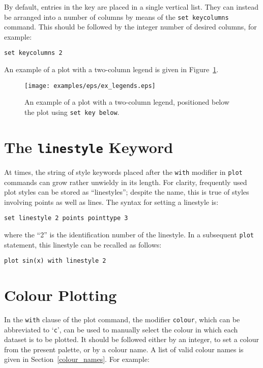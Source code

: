 By default, entries in the key are placed in a single vertical list. They can
instead be arranged into a number of columns by means of the \texttt{set
keycolumns} command. This should be followed by the integer number of desired columns, for
example:

\begin{verbatim}
set keycolumns 2
\end{verbatim}

\noindent An example of a plot with a two-column legend is given in
Figure~\ref{fig:ex_legends}.

\begin{figure}
\begin{center}
\texttt{[image: examples/eps/ex\_legends.eps]}
\end{center}
\caption{An example of a plot with a two-column legend, positioned below the plot using {\tt set key below}.}
\label{fig:ex_legends}
\end{figure}

\section{The \texttt{linestyle} Keyword}

At times, the string of style keywords placed after the \texttt{with} modifier
in \texttt{plot} commands can grow rather unwieldy in its length. For clarity,
frequently used plot styles can be stored as ``linestyles''; despite the name,
this is true of styles involving points as well as lines. The syntax for
setting a linestyle is:

\begin{verbatim}
set linestyle 2 points pointtype 3
\end{verbatim}

\noindent where the ``2'' is the identification number of the linestyle. In a
subsequent \texttt{plot} statement, this linestyle can be recalled as follows:

\begin{verbatim}
plot sin(x) with linestyle 2
\end{verbatim}

\section{Colour Plotting}

 In the \texttt{with} clause of the plot
command, the modifier \texttt{colour}, which can be abbreviated to
`\texttt{c}', can be used to manually select the colour in which each dataset
is to be plotted. It should be followed either by an integer, to set a colour
from the present palette, or by a colour name. A list of valid colour names is
given in Section~\ref{colour_names}. For example:

